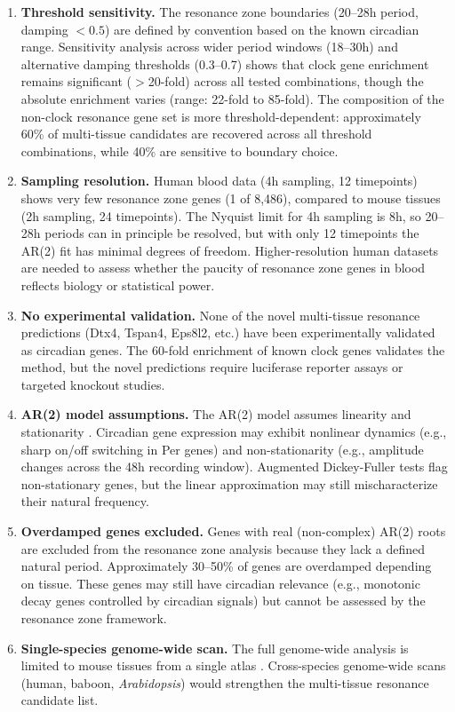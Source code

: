 \documentclass[11pt,letterpaper]{article}
\begin{document}
\begin{enumerate}
\item \textbf{Threshold sensitivity.} The resonance zone boundaries (20--28h period, damping $< 0.5$) are defined by convention based on the known circadian range. Sensitivity analysis across wider period windows (18--30h) and alternative damping thresholds (0.3--0.7) shows that clock gene enrichment remains significant ($>$20-fold) across all tested combinations, though the absolute enrichment varies (range: 22-fold to 85-fold). The composition of the non-clock resonance gene set is more threshold-dependent: approximately 60\% of multi-tissue candidates are recovered across all threshold combinations, while 40\% are sensitive to boundary choice.
\item \textbf{Sampling resolution.} Human blood data (4h sampling, 12 timepoints) shows very few resonance zone genes (1 of 8,486), compared to mouse tissues (2h sampling, 24 timepoints). The Nyquist limit for 4h sampling is 8h, so 20--28h periods can in principle be resolved, but with only 12 timepoints the AR(2) fit has minimal degrees of freedom. Higher-resolution human datasets are needed to assess whether the paucity of resonance zone genes in blood reflects biology or statistical power.
\item \textbf{No experimental validation.} None of the novel multi-tissue resonance predictions (Dtx4, Tspan4, Eps8l2, etc.) have been experimentally validated as circadian genes. The 60-fold enrichment of known clock genes validates the method, but the novel predictions require luciferase reporter assays or targeted knockout studies.
\item \textbf{AR(2) model assumptions.} The AR(2) model assumes linearity and stationarity \citep{hamilton1994time, box2015time}. Circadian gene expression may exhibit nonlinear dynamics (e.g., sharp on/off switching in Per genes) and non-stationarity (e.g., amplitude changes across the 48h recording window). Augmented Dickey-Fuller tests flag non-stationary genes, but the linear approximation may still mischaracterize their natural frequency.
\item \textbf{Overdamped genes excluded.} Genes with real (non-complex) AR(2) roots are excluded from the resonance zone analysis because they lack a defined natural period. Approximately 30--50\% of genes are overdamped depending on tissue. These genes may still have circadian relevance (e.g., monotonic decay genes controlled by circadian signals) but cannot be assessed by the resonance zone framework.
\item \textbf{Single-species genome-wide scan.} The full genome-wide analysis is limited to mouse tissues from a single atlas \citep{zhang2014circadian}. Cross-species genome-wide scans (human, baboon, \textit{Arabidopsis}) would strengthen the multi-tissue resonance candidate list.
\end{enumerate}
\end{document}
